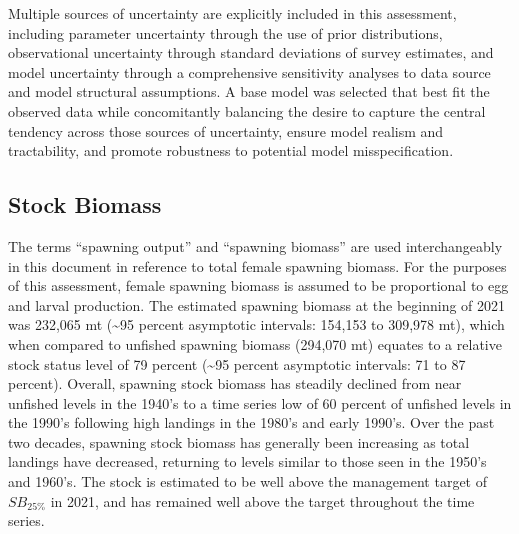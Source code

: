 \documentclass[11pt,
  english,
  a4paper,
]{article}
\begin{document}
\leavevmode\tagmcend\tagstructend\par


Multiple sources of uncertainty are explicitly included in this assessment, including parameter uncertainty through the use of prior distributions, observational uncertainty through standard deviations of survey estimates, and model uncertainty through a comprehensive sensitivity analyses to data source and model structural assumptions. A base model was selected that best fit the observed data while concomitantly balancing the desire to capture the central tendency across those sources of uncertainty, ensure model realism and tractability, and promote robustness to potential model misspecification.

\leavevmode\tagmcend\tagstructend\par


\hypertarget{stock-biomass}{%
\subsection*{Stock Biomass}\label{stock-biomass}}

\leavevmode\tagmcend\tagstructend


The terms ``spawning output'' and ``spawning biomass'' are used interchangeably in this document in reference to total female spawning biomass. For the purposes of this assessment, female spawning biomass is assumed to be proportional to egg and larval production. The estimated spawning biomass at the beginning of 2021 was 232,065 mt (\textasciitilde95 percent asymptotic intervals: 154,153 to 309,978 mt), which when compared to unfished spawning biomass (294,070 mt) equates to a relative stock status level of 79 percent (\textasciitilde95 percent asymptotic intervals: 71 to 87 percent). Overall, spawning stock biomass has steadily declined from near unfished levels in the 1940's to a time series low of 60 percent of unfished levels in the 1990's following high landings in the 1980's and early 1990's. Over the past two decades, spawning stock biomass has generally been increasing as total landings have decreased, returning to levels similar to those seen in the 1950's and 1960's. The stock is estimated to be well above the management target of {\(SB_{25\%}\)\leavevmode\tagmcend\tagstructend} in 2021, and has remained well above the target throughout the time series.
\end{document}
